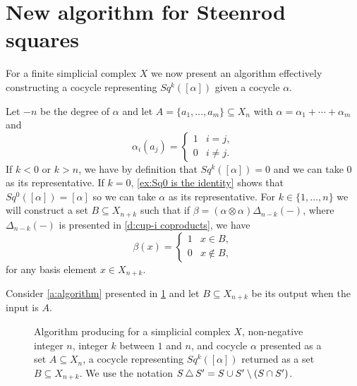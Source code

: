 
\section{New algorithm for Steenrod squares} \label{s:algorithm}


For a finite simplicial complex $X$ we now present an algorithm effectively constructing a cocycle representing $Sq^k([\alpha])$ given a cocycle $\alpha$.

Let $-n$ be the degree of $\alpha$ and let $A = \{a_1, \dots, a_m\} \subseteq X_n$ with $\alpha = \alpha_1 + \cdots + \alpha_m$ and
\begin{equation*}
\alpha_i(a_j) = \begin{cases}
1 & i=j, \\ 0 & i\neq j.
\end{cases}
\end{equation*}
If $k < 0$ or $k > n$, we have by definition that $Sq^k([\alpha]) = 0$ and we can take $0$ as its representative.
If $k = 0$, \cref{ex:Sq0 is the identity} shows that $Sq^0([\alpha]) = [\alpha]$ so we can take $\alpha$ as its representative.
For $k \in \{1, \dots, n\}$ we will construct a set $B \subseteq X_{n+k}$ such that if $\beta = (\alpha \otimes \alpha)\Delta_{n-k}(-)$, where $\Delta_{n-k}(-)$ is presented in \cref{d:cup-i coproducts}, we have
\begin{equation} \label{e:correctness}
\beta(x) =
\begin{cases}
1 & x \in B, \\
0 & x \not\in B,
\end{cases}
\end{equation}
for any basis element $x \in X_{n+k}$.

Consider \cref{a:algorithm} presented in \cref{f:algorithm} and let $B \subseteq X_{n+k}$ be its output when the input is $A$.

\begin{figure}
	
	\caption{Algorithm producing for a simplicial complex $X$, non-negative integer $n$, integer $k$ between $1$ and $n$, and cocycle $\alpha$ presented as a set $A \subseteq X_n$, a cocycle representing $Sq^k([\alpha])$ returned as a set $B \subseteq X_{n+k}$.
		We use the notation $S \operatorname{\triangle} S^\prime = S \cup S^\prime \setminus (S \cap S^\prime)$.}
	\label{f:algorithm}
\end{figure}

